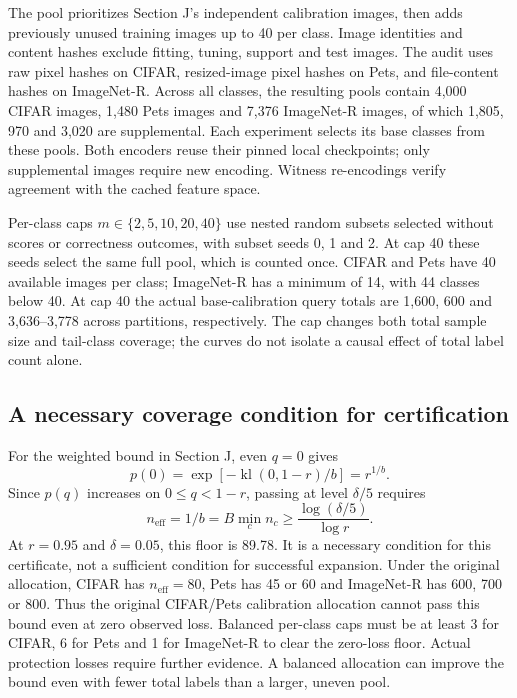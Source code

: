 \documentclass[preprint,review,12pt]{elsarticle}
\begin{document}
The pool prioritizes Section J's independent calibration images, then adds previously unused training images up to 40 per class. Image identities and content hashes exclude fitting, tuning, support and test images. The audit uses raw pixel hashes on CIFAR, resized-image pixel hashes on Pets, and file-content hashes on ImageNet-R. Across all classes, the resulting pools contain 4,000 CIFAR images, 1,480 Pets images and 7,376 ImageNet-R images, of which 1,805, 970 and 3,020 are supplemental. Each experiment selects its base classes from these pools. Both encoders reuse their pinned local checkpoints; only supplemental images require new encoding. Witness re-encodings verify agreement with the cached feature space.

Per-class caps $m\in\{2,5,10,20,40\}$ use nested random subsets selected without scores or correctness outcomes, with subset seeds 0, 1 and 2. At cap 40 these seeds select the same full pool, which is counted once. CIFAR and Pets have 40 available images per class; ImageNet-R has a minimum of 14, with 44 classes below 40. At cap 40 the actual base-calibration query totals are 1,600, 600 and 3,636--3,778 across partitions, respectively. The cap changes both total sample size and tail-class coverage; the curves do not isolate a causal effect of total label count alone.

\subsection{A necessary coverage condition for certification}
For the weighted bound in Section J, even $q=0$ gives
\begin{equation}
 p(0)=\exp[-\operatorname{kl}(0,1-r)/b]=r^{1/b}.
\end{equation}
Since $p(q)$ increases on $0\leq q<1-r$, passing at level $\delta/5$ requires
\begin{equation}
 n_{\mathrm{eff}}=1/b=B\min_c n_c\geq\frac{\log(\delta/5)}{\log r}.
\end{equation}
At $r=0.95$ and $\delta=0.05$, this floor is 89.78. It is a necessary condition for this certificate, not a sufficient condition for successful expansion. Under the original allocation, CIFAR has $n_{\mathrm{eff}}=80$, Pets has 45 or 60 and ImageNet-R has 600, 700 or 800. Thus the original CIFAR/Pets calibration allocation cannot pass this bound even at zero observed loss. Balanced per-class caps must be at least 3 for CIFAR, 6 for Pets and 1 for ImageNet-R to clear the zero-loss floor. Actual protection losses require further evidence. A balanced allocation can improve the bound even with fewer total labels than a larger, uneven pool.
\end{document}
